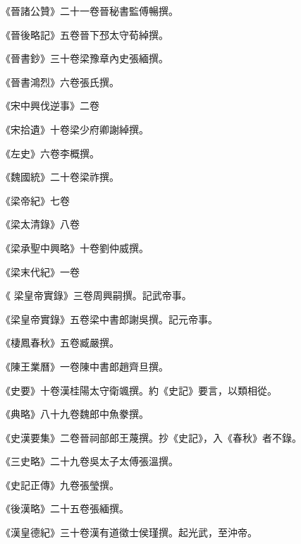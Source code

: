 \begin{pinyinscope}
 《晉諸公贊》二十一卷晉秘書監傅暢撰。



 《晉後略記》五卷晉下邳太守荀綽撰。



 《晉書鈔》三十卷梁豫章內史張緬撰。



 《晉書鴻烈》六卷張氏撰。



 《宋中興伐逆事》二卷



 《宋拾遺》十卷梁少府卿謝綽撰。



 《左史》六卷李概撰。



 《魏國統》二十卷梁祚撰。



 《梁帝紀》七卷



 《梁太清錄》八卷



 《梁承聖中興略》十卷劉仲威撰。



 《梁末代紀》一卷



 《
 梁皇帝實錄》三卷周興嗣撰。記武帝事。



 《梁皇帝實錄》五卷梁中書郎謝吳撰。記元帝事。



 《棲鳳春秋》五卷臧嚴撰。



 《陳王業曆》一卷陳中書郎趙齊旦撰。



 《史要》十卷漢桂陽太守衛颯撰。約《史記》要言，以類相從。



 《典略》八十九卷魏郎中魚豢撰。



 《史漢要集》二卷晉祠部郎王蔑撰。抄《史記》，入《春秋》者不錄。



 《三史略》二十九卷吳太子太傅張溫撰。



 《史記正傳》九卷張瑩撰。



 《後漢略》二十五卷張緬撰。



 《漢皇德紀》三十卷漢有道徵士侯瑾撰。起光武，至沖帝。




\end{pinyinscope}
